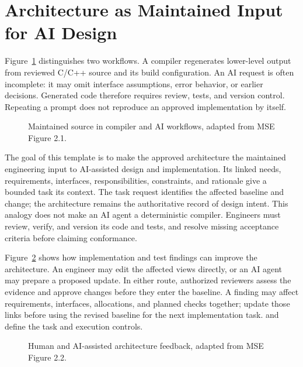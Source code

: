 \section{Architecture as Maintained Input for AI Design}
\label{Section:ArchitectureAIDesign}
Figure~\ref{Figure:MaintainedSourceComparison} distinguishes two workflows.
A compiler regenerates lower-level output from reviewed C/C++ source and its
build configuration. An AI request is often incomplete: it may omit interface
assumptions, error behavior, or earlier decisions. Generated code therefore
requires review, tests, and version control. Repeating a prompt does not
reproduce an approved implementation by itself.

\begin{figure}[htbp]
\centering
\resizebox{\textwidth}{!}{}
\caption{Maintained source in compiler and AI workflows, adapted from MSE Figure 2.1.}
\label{Figure:MaintainedSourceComparison}
\end{figure}

The goal of this template is to make the approved architecture the maintained
engineering input to AI-assisted design and implementation. Its linked needs,
requirements, interfaces, responsibilities, constraints, and rationale give a
bounded task its context. The task request identifies the affected baseline and
change; the architecture remains the authoritative record of design intent.
This analogy does not make an AI agent a deterministic compiler. Engineers must
review, verify, and version its code and tests, and resolve missing acceptance
criteria before claiming conformance.

Figure~\ref{Figure:ArchitectureUpdateFeedback} shows how implementation and
test findings can improve the architecture. An engineer may edit the affected
views directly, or an AI agent may prepare a proposed update. In either route,
authorized reviewers assess the evidence and approve changes before they enter
the baseline. A finding may affect requirements, interfaces, allocations, and
planned checks together; update those links before using the revised baseline
for the next implementation task.  and
 define the task and execution controls.

\begin{figure}[htbp]
\centering
\resizebox{\textwidth}{!}{}
\caption{Human and AI-assisted architecture feedback, adapted from MSE Figure 2.2.}
\label{Figure:ArchitectureUpdateFeedback}
\end{figure}

